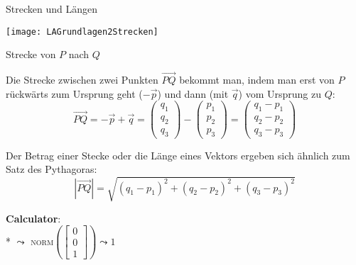 \begin{bla}{Strecken und Längen}
  \begin{marginfigure}[10em]
    \texttt{[image: LAGrundlagen2Strecken]}
    \caption{Strecke von $P$ nach $Q$}
  \end{marginfigure}
  Die Strecke zwischen zwei Punkten $\overrightarrow{PQ}$ bekommt man, indem man erst von $P$ rückwärts zum Ursprung geht ($-\vec{p}$) und dann (mit $\vec{q}$) vom Ursprung zu $Q$:
  \begin{equation*}
    \overrightarrow{PQ} = - \vec{p} + \vec{q} = \begin{pmatrix}
      q_1\\q_2\\q_3
    \end{pmatrix}
    -
    \begin{pmatrix}
      p_1\\p_2\\p_3
    \end{pmatrix}
    =
    \begin{pmatrix}
      q_1 - p_1 \\ q_2 - p_2 \\ q_3 - p_3
    \end{pmatrix}
  \end{equation*}

  Der Betrag einer Stecke oder die Länge eines Vektors ergeben sich ähnlich zum Satz des Pythagoras:
  \begin{equation*}
    |\overrightarrow{PQ}| = \sqrt{(q_1 - p_1)^2 + (q_2 - p_2)^2 + (q_3 - p_3)^2}
  \end{equation*}
   \begin{marginfigure}
    \begin{tcolorbox}[colback=white!95!black,colframe=white!75!black,title=CAS:,arc=0mm]
      \begin{scriptsize}
        \textbf{Calculator}: \\*
        \( \leadsto \) \textsc{norm}\( \left( \left[ \begin{smallmatrix}
          0 \\ 0 \\ 1
        \end{smallmatrix} \right] \right) \leadsto 1 \)
      \end{scriptsize}
    \end{tcolorbox}
  \end{marginfigure}
\end{bla}

